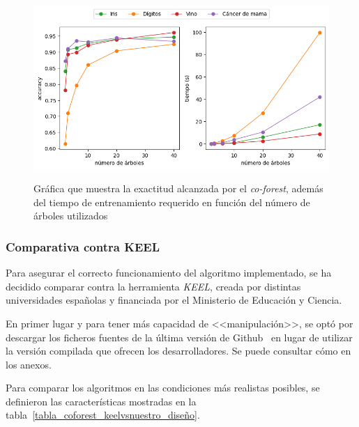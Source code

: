 \begin{itemize}
	\begin{figure}[h]
		\caption[\textit{Co-Forest}: resultados experimentación (número de árboles)]{Gráfica que muestra la exactitud alcanzada por el \textit{co-forest}, además del tiempo de entrenamiento requerido en función del número de árboles utilizados}
		\centering
		\includegraphics[scale=0.7]{../img/memoria/5_coforest_trees}
		\label{cf:tt_trees}
	\end{figure}
	
\end{itemize} 


\subsubsection{Comparativa contra KEEL}

Para asegurar el correcto funcionamiento del algoritmo implementado, se ha decidido comparar contra la herramienta \textit{KEEL}, creada por distintas universidades españolas y financiada por el Ministerio de Educación y Ciencia.

En primer lugar y para tener más capacidad de <<manipulación>>, se optó por descargar los ficheros fuentes de la última versión de Github~\cite{keelRepo} en lugar de utilizar la versión compilada que ofrecen los desarrolladores. Se puede consultar cómo en los anexos.

Para comparar los algoritmos en las condiciones más realistas posibles, se definieron las características mostradas en la tabla~\ref{tabla_coforest_keelvsnuestro_diseño}.

